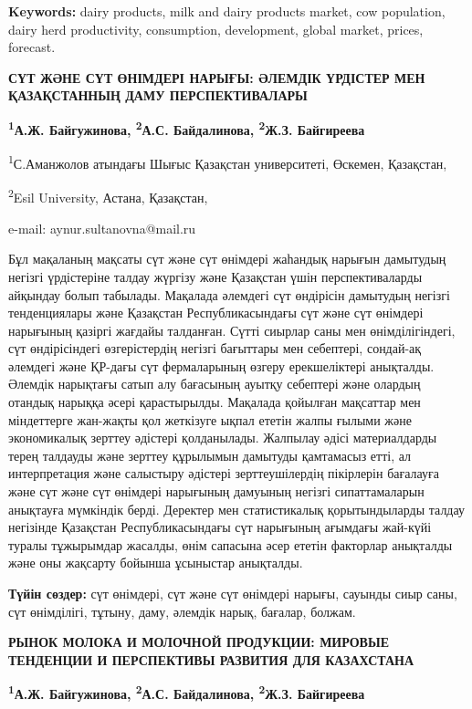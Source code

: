 {\bfseries Keywords:} dairy products, milk and dairy products market, cow
population, dairy herd productivity, consumption, development, global
market, prices, forecast.

\begin{articleheader}
{\bfseries СҮТ ЖӘНЕ СҮТ ӨНІМДЕРІ НАРЫҒЫ: ӘЛЕМДІК ҮРДІСТЕР МЕН ҚАЗАҚСТАННЫҢ
ДАМУ ПЕРСПЕКТИВАЛАРЫ}

{\bfseries
\textsuperscript{1}А.Ж. Байгужинова,
\textsuperscript{2}А.С. Байдалинова\textsuperscript{\envelope },
\textsuperscript{2}Ж.З. Байгиреева
}
\end{articleheader}

\begin{affiliation}
\textsuperscript{1}С.Аманжолов атындағы Шығыс Қазақстан университеті, Өскемен, Қазақстан,

\textsuperscript{2}Esil University, Астана, Қазақстан,

e-mail: aynur.sultanovna@mail.ru
\end{affiliation}

Бұл мақаланың мақсаты сүт және сүт өнімдері жаһандық нарығын дамытудың
негізгі үрдістеріне талдау жүргізу және Қазақстан үшін перспективаларды
айқындау болып табылады. Мақалада әлемдегі сүт өндірісін дамытудың
негізгі тенденциялары және Қазақстан Республикасындағы сүт және сүт
өнімдері нарығының қазіргі жағдайы талданған. Сүтті сиырлар саны мен
өнімділігіндегі, сүт өндірісіндегі өзгерістердің негізгі бағыттары мен
себептері, сондай-ақ әлемдегі және ҚР-дағы сүт фермаларының өзгеру
ерекшеліктері анықталды. Әлемдік нарықтағы сатып алу бағасының ауытқу
себептері және олардың отандық нарыққа әсері қарастырылды. Мақалада
қойылған мақсаттар мен міндеттерге жан-жақты қол жеткізуге ықпал ететін
жалпы ғылыми және экономикалық зерттеу әдістері қолданылады. Жалпылау
әдісі материалдарды терең талдауды және зерттеу құрылымын дамытуды
қамтамасыз етті, ал интерпретация және салыстыру әдістері
зерттеушілердің пікірлерін бағалауға және сүт және сүт өнімдері
нарығының дамуының негізгі сипаттамаларын анықтауға мүмкіндік берді.
Деректер мен статистикалық қорытындыларды талдау негізінде Қазақстан
Республикасындағы сүт нарығының ағымдағы жай-күйі туралы тұжырымдар
жасалды, өнім сапасына әсер ететін факторлар анықталды және оны жақсарту
бойынша ұсыныстар анықталды.

{\bfseries Түйін сөздер:} сүт өнімдері, сүт және сүт өнімдері нарығы,
сауынды сиыр саны, сүт өнімділігі, тұтыну, даму, әлемдік нарық, бағалар,
болжам.

\begin{articleheader}
{\bfseries РЫНОК МОЛОКА И МОЛОЧНОЙ ПРОДУКЦИИ: МИРОВЫЕ ТЕНДЕНЦИИ И
ПЕРСПЕКТИВЫ РАЗВИТИЯ ДЛЯ КАЗАХСТАНА}

{\bfseries
\textsuperscript{1}А.Ж. Байгужинова,
\textsuperscript{2}А.С. Байдалинова\textsuperscript{\envelope },
\textsuperscript{2}Ж.З. Байгиреева
}
\end{articleheader}

